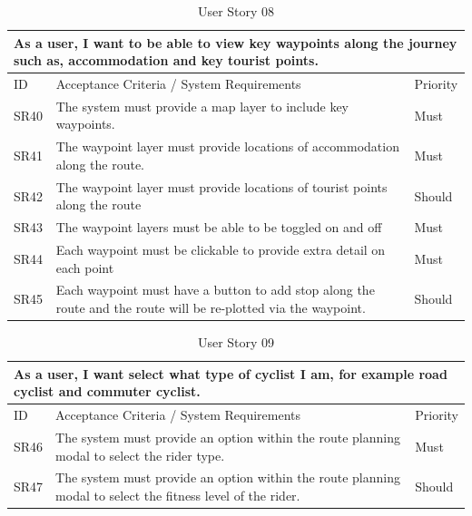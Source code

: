 \begin{table}[!htb]
  \caption{User Story 08}
  \label{tab:user-story-08}
  \begin{tabular}{ m{1cm} m{11cm} m{1cm} }
  \hline
  \multicolumn{3}{p{13cm}}{As a user, I want to be able to view key waypoints along the journey such as, accommodation and key tourist points.}\\ 
  \hline
  ID & Acceptance Criteria / System Requirements & Priority\\
  \hline
  \label{SR:40}SR40 & The system must provide a map layer to include key waypoints. & Must \\
  \label{SR:41}SR41 & The waypoint layer must provide locations of accommodation along the route. & Must\\
  \label{SR:42}SR42 & The waypoint layer must provide locations of tourist points along the route & Should\\
  \label{SR:43}SR43 & The waypoint layers must be able to be toggled on and off & Must\\
  \label{SR:44}SR44 & Each waypoint must be clickable to provide extra detail on each point & Must\\
  \label{SR:45} SR45 & Each waypoint must have a button to add stop along the route and the route will be re-plotted via the waypoint. & Should\\
  \hline
  \end{tabular}
\end{table}

\begin{table}[!htb]
  \caption{User Story 09}
  \label{tab:user-story-09}
  \begin{tabular}{ m{1cm} m{11cm} m{1cm} }
  \hline
  \multicolumn{3}{p{13cm}}{As a user, I want select what type of cyclist I am, for example road cyclist and commuter cyclist.}\\ 
  \hline
  ID & Acceptance Criteria / System Requirements & Priority\\
  \hline
  \label{SR:46}SR46 & The system must provide an option within the route planning modal to select the rider type. & Must\\
  \label{SR:47}SR47 & The system must provide an option within the route planning modal to select the fitness level of the rider. & Should\\
  \hline
  \end{tabular}
\end{table}

